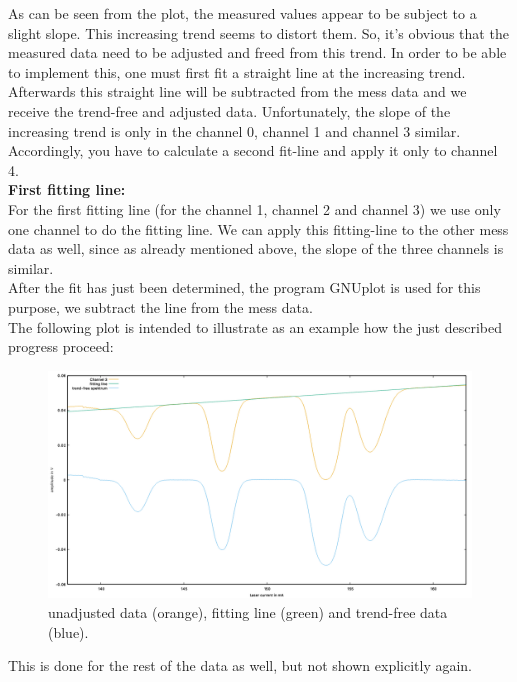 As can be seen from the plot, the measured values appear to be subject to a slight slope.
This increasing trend seems to distort them. 
So, it's obvious that the measured data need to be adjusted and freed from this trend.
In order to be able to implement this, one must first fit a straight line at the increasing trend.
Afterwards this straight line will be subtracted from the mess data and we receive the trend-free and adjusted data. 
\newpage
Unfortunately, the slope of the increasing trend is only in the channel 0, channel 1 and channel 3 similar. 
Accordingly, you have to calculate a second fit-line and apply it only to channel 4.\\
\textbf{First fitting line:}\\
For the first fitting line (for the channel 1, channel 2 and channel 3) we use only one channel 
to do the fitting line. We can apply this fitting-line to the other mess data as well, since as already mentioned above, 
the slope of the three channels is similar.\\
After the fit has just been determined, the program GNUplot is used for this purpose, 
we subtract the line from the mess data. \\
The following plot is intended to illustrate as an example how the just described progress proceed:\\
\begin{center}
    \begin{figure}[h]
        \centering
        \includegraphics[scale=0.3]{Bilder/Auswertung_Anna/clean_ch3.png}
        \caption{unadjusted data (orange), fitting line (green) and trend-free data (blue).}
        \label{fig:ch3_clean}
    \end{figure}
\end{center}
This is done for the rest of the data as well, but not shown explicitly again.\\
